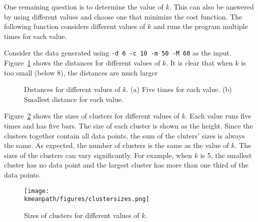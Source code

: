 One remaining question is to determine the value of $k$.  This can
also be answered by using different values and choose one that
minimize the cost function.  The following function considers
different values of $k$ and runs the program multiple times for each
value.

\resetlinenumber[1]
\linenumbers
\begin{tt}
  
\end{tt}
\nolinenumbers

Consider the data generated using {\tt -d 6 -c 10 -m 50 -M 60} as the
input.  Figure~\ref{figure:kmean:distances} shows the distances for
different values of $k$.  It is clear that when $k$ is too small
(below 8), the distances are much larger

\begin{figure}[h] \centering
\caption{Distances for different values of $k$. (a) Five times for each
  value. (b) Smallest distance for each value.}
\label{figure:kmean:distances}
\end{figure}

Figure~\ref{figure:kmean:clustersizes} shows the sizes of clusters for
different values of $k$. Each value runs five times and has five
bars. The size of each cluster is shown as the height. Since the
clusters together contain all data points, the sum of the cluters'
sizes is always the same.  As expected, the number of clusters is the
same as the value of $k$.  The sizes of the clusters can vary significantly.
For example, when $k$ is 5, the smallest cluster has no data point and
the largest cluster has more than one third of the data points.

\begin{figure}[h] \centering
{\texttt{[image: \\kmeanpath/figures/clustersizes.png]}}
\caption{Sizes of clusters for different values of $k$.}
\label{figure:kmean:clustersizes}
\end{figure}

\clearpage
